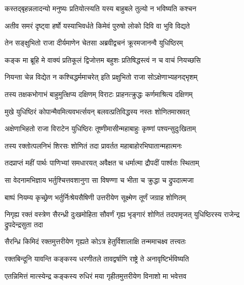\twolineshloka
{कस्तद्बृहन्नलादन्यो मनुष्यः प्रतियोत्स्यति}
{यस्य बाहुबले तुल्यो न भविष्यति कश्चन}


\twolineshloka
{अतीव समरं दृष्ट्वा हर्षो यस्याभिवर्धते}
{किमेवं पुरुषो लोको दिवि वा भुवि विद्यते}



\twolineshloka
{तेन सङ्क्षुभितो राजा दीर्यमाणेन चेतसा}
{अब्रवीद्वचनं क्रूरमजानन्वै युधिष्ठिरम्}


\twolineshloka
{कङ्क मा ब्रूहि मे वाक्यं प्रतिकूलं द्विजोत्तम}
{बहुशः प्रतिषिद्धस्त्वं न च वाचं नियच्छसि}


\twolineshloka
{नियन्ता चेन्न विद्येत न कश्चिद्धर्ममाचरेत्}
{इति प्रक्षुभितो राजा सोऽक्षेणाभ्यहनद्भृशम्}


\twolineshloka
{तस्य तक्षकभोगाभं बाहुमुत्क्षिप्य दक्षिणम्}
{विराटः प्राहनत्क्रुद्धः कर्णमाश्रित्य दक्षिणम्}


\twolineshloka
{मुखे युधिष्ठिरं कोपान्मैवमित्यवभर्त्सयन्}
{बलवत्प्रतिविद्धस्य नस्तः शोणितमास्रवत्}


\twolineshloka
{अक्षेणाभिहतो राजा विराटेन युधिष्ठिरः}
{तूष्णीमासीन्महाबाहुः कृष्णां पश्यन्सुदुःखिताम्}


\twolineshloka
{तस्य रक्तोत्पलनिभं शिरसः शोणितं तदा}
{प्रावर्तत महाबाहोरभिघातान्महात्मनः}


\twolineshloka
{तदप्राप्तं महीं पार्थः पाणिभ्यां समधारयत्}
{अवैक्षत च धर्मात्मा द्रौपदीं पार्श्वतः स्थिताम्}


\twolineshloka
{सा वेदनामभिज्ञाय भर्तुश्चित्तवशानुगा}
{सा विषण्णा च भीता च क्रुद्धा च द्रुपदात्मजा}


\twolineshloka
{बाष्पं नियम्य कृच्छ्रेण भर्तुर्निःश्रेयसैषिणी}
{उत्तरीयेण सूक्ष्मेण तूर्णं जग्राह शोणितम्}


\threelineshloka
{निगृह्य रक्तं वस्त्रेण सैरन्ध्री दुःखमोहिता}
{सौवर्णं गृह्य भृङ्गारं शोणितं तदपामृजत्}
{युधिष्ठिरस्य राजेन्द्र द्रुपदेन्द्रसुता तदा}




\twolineshloka
{सैरन्ध्रि किमिदं रक्तमुत्तरीयेण गृह्यते}
{कोऽत्र हेतुर्विशालाक्षि तन्ममाचक्ष्व तत्त्वतः}




\twolineshloka
{रक्तबिन्दूनि यावन्ति कङ्कस्य धरणीतले}
{तावद्वर्षाणि राष्ट्रे ते अनावृष्टिर्भविष्यति}


\twolineshloka
{एतन्निमित्तं मात्स्येन्द्र कङ्कस्य रुधिरं मया}
{गृहीतमुत्तरीयेण विनाशो मा भवेत्तव}



